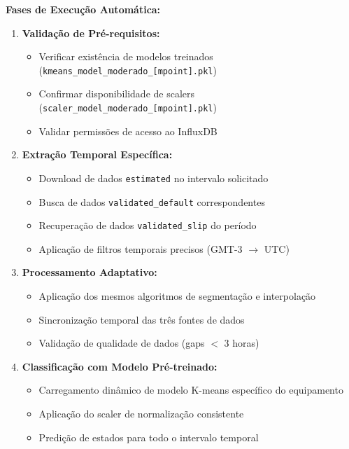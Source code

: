 \textbf{Fases de Execução Automática:}

\begin{enumerate}
    \item \textbf{Validação de Pré-requisitos:}
    \begin{itemize}
        \item Verificar existência de modelos treinados (\texttt{kmeans\_model\_moderado\_[mpoint].pkl})
        \item Confirmar disponibilidade de scalers (\texttt{scaler\_model\_moderado\_[mpoint].pkl})
        \item Validar permissões de acesso ao InfluxDB
    \end{itemize}

    \item \textbf{Extração Temporal Específica:}
    \begin{itemize}
        \item Download de dados \texttt{estimated} no intervalo solicitado
        \item Busca de dados \texttt{validated\_default} correspondentes
        \item Recuperação de dados \texttt{validated\_slip} do período
        \item Aplicação de filtros temporais precisos (GMT-3 $\rightarrow$ UTC)
    \end{itemize}

    \item \textbf{Processamento Adaptativo:}
    \begin{itemize}
        \item Aplicação dos mesmos algoritmos de segmentação e interpolação
        \item Sincronização temporal das três fontes de dados
        \item Validação de qualidade de dados (gaps $<$ 3 horas)
    \end{itemize}

    \item \textbf{Classificação com Modelo Pré-treinado:}
    \begin{itemize}
        \item Carregamento dinâmico de modelo K-means específico do equipamento
        \item Aplicação do scaler de normalização consistente
        \item Predição de estados para todo o intervalo temporal
    \end{itemize}
\end{enumerate}

